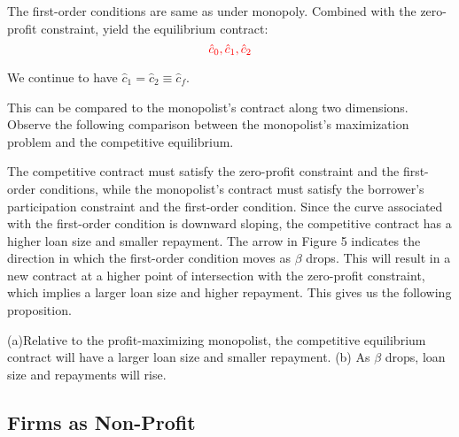 \documentclass[11pt]{article}%
\newtheorem{proposition}{Proposition}
\providecommand{\DIFdel}[1]{{\protect\color{red} \scriptsize #1}} %
\begin{document}
{%
\DIFdel{The first-order conditions are same as under monopoly. Combined with the
zero-profit constraint, yield the equilibrium contract:%
}\begin{displaymath}\DIFdel{
\hat{c}_{0},\hat{c}_{1},\hat{c}_{2}
}\end{displaymath}

\DIFdel{We continue to have $\hat{c}_{1}=\hat{c}_{2}\equiv \hat{c}_{f}$.
}%

\DIFdel{This can be compared to the monopolist's contract along two dimensions.
Observe the following comparison between the monopolist's maximization
problem and the competitive equilibrium.
}%


\DIFdel{The competitive contract must satisfy the zero-profit constraint and the
first-order conditions, while the monopolist's contract must satisfy the
borrower's participation constraint and the first-order condition. Since the
curve associated with the first-order condition is downward sloping, the
competitive contract has a higher loan size and smaller repayment.  
The arrow
in Figure 5 indicates the direction in which the first-order condition moves
as $\beta $ drops. This will result in a new contract at a higher point of
intersection with the zero-profit constraint, which implies a larger loan
size and higher repayment. This gives us the following proposition.
}%

\DIFdel{(a)Relative to the profit-maximizing monopolist, the competitive equilibrium
contract will have a larger loan size and smaller repayment. (b) As $\beta $
drops, loan size and repayments will rise.
}%

\subsection{\DIFdel{Firms as Non-Profit}}
\addtocounter{subsection}{-1}%

}
\end{document}

